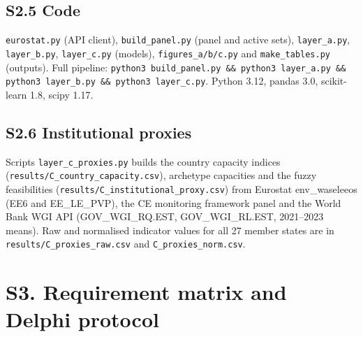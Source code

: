 \documentclass[11pt]{article}
\begin{document}
\subsection*{S2.5 Code}
\texttt{eurostat.py} (API client), \texttt{build\_panel.py} (panel and active sets), \texttt{layer\_a.py}, \texttt{layer\_b.py}, \texttt{layer\_c.py} (models), \texttt{figures\_a/b/c.py} and \texttt{make\_tables.py} (outputs). Full pipeline: \texttt{python3 build\_panel.py \&\& python3 layer\_a.py \&\& python3 layer\_b.py \&\& python3 layer\_c.py}. Python 3.12, pandas 3.0, scikit-learn 1.8, scipy 1.17.

\subsection*{S2.6 Institutional proxies}
Scripts \texttt{layer\_c\_proxies.py} builds the country capacity indices (\texttt{results/C\_country\_capacity.csv}), archetype capacities and the fuzzy feasibilities (\texttt{results/C\_institutional\_proxy.csv}) from Eurostat env\_waseleeos (EE6 and EE\_LE\_PVP), the CE monitoring framework panel and the World Bank WGI API (GOV\_WGI\_RQ.EST, GOV\_WGI\_RL.EST, 2021--2023 means). Raw and normalised indicator values for all 27 member states are in \texttt{results/C\_proxies\_raw.csv} and \texttt{C\_proxies\_norm.csv}.

\section*{S3. Requirement matrix and Delphi protocol}
\end{document}
